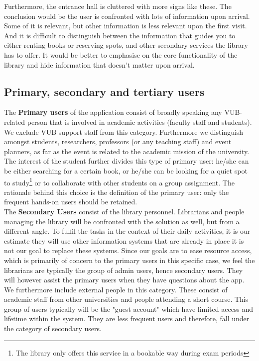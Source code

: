 \documentclass[a4paper, 11pt]{article}
\begin{document}
Furthermore, the entrance hall is cluttered with more signs like these. The conclusion would be the user is confronted with lots of information upon arrival. Some of it is relevant, but other information is less relevant upon the first visit. And it is difficult to distinguish between the information that guides you to either renting books or reserving spots, and other secondary services the library has to offer. It would be better to emphasise on the core functionality of the library and hide information that doesn't matter upon arrival.

\subsection{Primary, secondary and tertiary users}
The \textbf{Primary users} of the application consist of broadly speaking any VUB-related person that is involved in academic activities (faculty staff and students). We exclude VUB support staff from this category. Furthermore we distinguish amongst students, researchers, professors (or any teaching staff) and event planners, as far as the event is related to the academic mission of the university. The interest of the student further divides this type of primary user: he/she can be either searching for a certain book, or he/she can be looking for a quiet spot to study\footnote{The library only offers this service in a bookable way during exam periods} or to collaborate with other students on a group assignment. The rationale behind this choice is the definition of the primary user: only the frequent hands-on users should be retained.\\

The \textbf{Secondary Users} consist of the library personnel. Librarians and people managing the library will be confronted with the solution as well, but from a different angle. To fulfil the tasks in the context of their daily activities, it is our estimate they will use other information systems that are already in place it is not our goal to replace these systems. Since our goals are to ease resource access, which is primarily of concern to the primary users in this specific case, we feel the librarians are typically the group of admin users, hence secondary users. They will however assist the primary users when they have questions about the app. We furthermore include external people in this category. These consist of academic staff from other universities and people attending a short course. This group of users typically will be the "guest account" which have limited access and lifetime within the system. They are less frequent users and therefore, fall under the category of secondary users.\\
\end{document}
